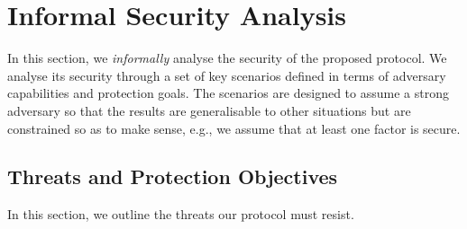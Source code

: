 
\vspace{-1mm}
\section{Informal Security Analysis}
\label{sec:security}

In this section, we \textit{informally} analyse the security of the proposed protocol. We analyse its security through a set of key scenarios defined in terms of adversary capabilities and protection goals.
The scenarios are designed to assume a strong adversary so that the results are generalisable to other situations but are constrained so as to make sense, e.g., we assume that at least one factor is secure.


\vspace{-1mm}
\subsection{Threats and Protection Objectives}

In this section, we outline the threats our protocol must resist. 



